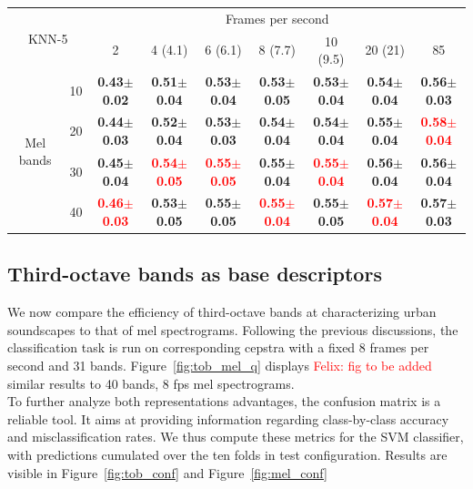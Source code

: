 \documentclass[final,3p,times,twocolumn]{elsarticle}
\newcommand{\fg}[1]{\textcolor{red}{ Felix: #1}}
\begin{document}
\begin{table}[h]
\begin{tabular}{ll|c|c|c|c|c|c|c|} 
\cline{3-9}
\multicolumn{2}{c}{\multirow{2}{*}{KNN-5}} & \multicolumn{7}{|c|}{Frames per second}\\ \cline{3-9}
 & & 2 & 4 (4.1) & 6 (6.1) & 8 (7.7) & 10 (9.5) & 20 (21) & 85 \\ \cline{1-9} 
\multicolumn{1}{|c}{\multirow{4}{*}{Mel bands}}
 & \multicolumn{1}{|c|}{10} & \textbf{0.43$\pm$0.02} & \textbf{0.51$\pm$0.04} & \textbf{0.53$\pm$0.04} & \textbf{0.53$\pm$0.05} & \textbf{0.53$\pm$0.04} & \textbf{0.54$\pm$0.04} & \textbf{0.56$\pm$0.03} \\ \cline{2-9}
\multicolumn{1}{|c}{}
 & \multicolumn{1}{|c|}{20} & \textbf{0.44$\pm$0.03} & \textbf{0.52$\pm$0.04} & \textbf{0.53$\pm$0.03} & \textbf{0.54$\pm$0.04} & \textbf{0.54$\pm$0.04} & \textbf{0.55$\pm$0.04} & \textbf{\textcolor{red}{0.58$\pm$0.04}} \\ \cline{2-9}
\multicolumn{1}{|c}{}
 & \multicolumn{1}{|c|}{30} & \textbf{0.45$\pm$0.04} & \textbf{\textcolor{red}{0.54$\pm$0.05}} & \textbf{\textcolor{red}{0.55$\pm$0.05}} & \textbf{0.55$\pm$0.04} & \textbf{\textcolor{red}{0.55$\pm$0.04}} & \textbf{0.56$\pm$0.04} & \textbf{0.56$\pm$0.04} \\ \cline{2-9}
\multicolumn{1}{|c}{}
 & \multicolumn{1}{|c|}{40} & \textbf{\textcolor{red}{0.46$\pm$0.03}} & \textbf{0.53$\pm$0.05} & \textbf{0.55$\pm$0.05} & \textbf{\textcolor{red}{0.55$\pm$0.04}} & \textbf{0.55$\pm$0.05} & \textbf{\textcolor{red}{0.57$\pm$0.04}} & \textbf{0.57$\pm$0.03} \\ \cline{1-9} 
\end{tabular} 
\end{table}


\subsection{Third-octave bands as base descriptors}

We now compare the efficiency of third-octave bands at characterizing urban soundscapes to that of mel spectrograms. Following the previous discussions, the classification task is run on corresponding cepstra with a fixed 8 frames per second and 31 bands. Figure~\ref{fig:tob_mel_q} displays \fg{fig to be added} similar results to 40 bands, 8 fps mel spectrograms.\\

To further analyze both representations advantages, the confusion matrix is a reliable tool. It aims at providing information regarding class-by-class accuracy and misclassification rates. We thus compute these metrics for the SVM classifier, with predictions cumulated over the ten folds in test configuration. Results are visible in Figure~\ref{fig:tob_conf} and Figure~\ref{fig:mel_conf}
\end{document}
